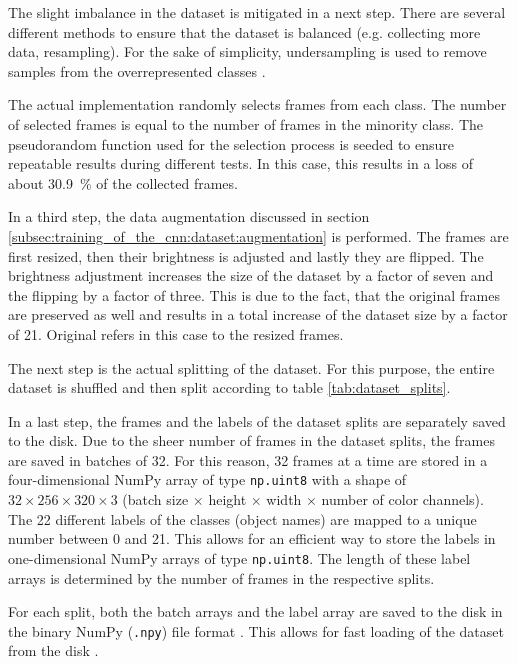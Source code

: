 The slight imbalance in the dataset is mitigated in a next step.
There are several different methods to ensure that the dataset is balanced (e.g. collecting more data, resampling).
For the sake of simplicity, undersampling is used to remove samples from the overrepresented classes \cite{training_imbalanced}.

The actual implementation randomly selects frames from each class.
The number of selected frames is equal to the number of frames in the minority class.
The pseudorandom function used for the selection process is seeded to ensure repeatable results during different tests.
In this case, this results in a loss of about \SI{30.9}{\percent} of the collected frames.

In a third step, the data augmentation discussed in section \ref{subsec:training_of_the_cnn:dataset:augmentation} is performed.
The frames are first resized, then their brightness is adjusted and lastly they are flipped.
The brightness adjustment increases the size of the dataset by a factor of seven and the flipping by a factor of three.
This is due to the fact, that the original frames are preserved as well and results in a total increase of the dataset size by a factor of \num{21}.
Original refers in this case to the resized frames.

The next step is the actual splitting of the dataset.
For this purpose, the entire dataset is shuffled and then split according to table \ref{tab:dataset_splits}.

In a last step, the frames and the labels of the dataset splits are separately saved to the disk.
Due to the sheer number of frames in the dataset splits, the frames are saved in batches of \num{32}.
For this reason, \num{32} frames at a time are stored in a four-dimensional NumPy array of type \texttt{np.uint8} with a shape of $32\times 256\times 320\times 3$ (batch size $\times$ height $\times$ width $\times$ number of color channels).
The \num{22} different labels of the classes (object names) are mapped to a unique number between \num{0} and \num{21}.
This allows for an efficient way to store the labels in one-dimensional NumPy arrays of type \texttt{np.uint8}.
The length of these label arrays is determined by the number of frames in the respective splits.

For each split, both the batch arrays and the label array are saved to the disk in the binary NumPy (\texttt{.npy}) file format \cite{training_numpy_format}.
This allows for fast loading of the dataset from the disk \cite{training_numpy_npy}.

